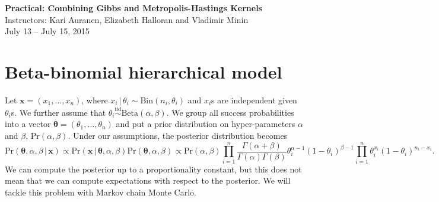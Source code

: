 \documentclass[11pt]{article}
\newcommand{\cprob}[2]{\ensuremath{\text{Pr}\left(#1 \,|\,#2\right)}}
\newcommand{\prob}[1]{\ensuremath{\text{Pr}\left(#1 \right)}}
\newcommand{\iid}{\ensuremath{\overset{\text{iid}}{\sim}}}
\theoremstyle{remark}
\theoremstyle{definition}
\numberwithin{equation}{section}
\numberwithin{figure}{section}
\begin{document}


\begin{center}
  \textbf{\Large Practical: Combining Gibbs and Metropolis-Hastings Kernels}\\
  {\large Instructors: Kari Auranen, Elizabeth Halloran and Vladimir Minin}\\
  {\large July 13 -- July 15, 2015}
\end{center}

\section{Beta-binomial hierarchical model}
  Let $\mathbf{x} = (x_1,\dots,x_n)$, where $x_i\,|\,\theta_i \sim \text{Bin}(n_i,\theta_i)$ and $x_i$s are 
  independent given $\theta_i$s. We further assume that $\theta_i \iid \text{Beta}(\alpha,\beta)$. We group
  all success probabilities into a vector $\boldsymbol{\theta} = (\theta_1,\dots,\theta_n)$ and put 
  a prior distribution on hyper-parameters $\alpha$ and $\beta$, $\prob{\alpha,\beta}$. Under our assumptions,
  the posterior distribution becomes
  \[
  \cprob{\boldsymbol{\theta}, \alpha, \beta}{\mathbf{x}} \propto 
  \cprob{\mathbf{x}}{\boldsymbol{\theta},\alpha,\beta}\prob{\boldsymbol{\theta}, \alpha, \beta} \propto
  \prob{\alpha,\beta} \prod_{i=1}^n \frac{\Gamma(\alpha+\beta)}{\Gamma(\alpha)\Gamma(\beta)} \theta_i^{\alpha-1}
  (1-\theta_i)^{\beta -1} \prod_{i=1}^n \theta_i^{x_i} (1-\theta_i)^{n_i-x_i}.
  \]
  We can compute the posterior up to a proportionality constant, but this does not mean that we can compute
  expectations with respect to the posterior. We will tackle this problem with Markov chain Monte Carlo.
\end{document}
